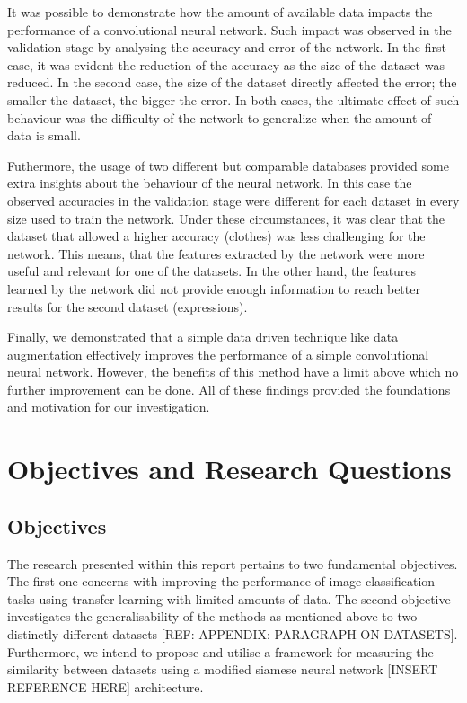 \documentclass{article}
\begin{document}
It was possible to demonstrate how the amount of available data impacts the performance of a convolutional neural network. Such impact was observed in the validation stage by analysing the accuracy and error of the network. In the first case, it was evident the reduction of the accuracy as the size of the dataset was reduced. In the second case, the size of the dataset directly affected the error; the smaller the dataset, the bigger the error. In both cases, the ultimate effect of such behaviour was the difficulty of the network to generalize when the amount of data is small.

Futhermore, the usage of two different but comparable databases provided some extra insights about the behaviour of the neural network. In this case the observed accuracies in the validation stage were different for each dataset in every size used to train the network. Under these circumstances, it was clear that the dataset that allowed a higher accuracy (clothes) was less challenging for the network. This means, that the features extracted by the network were more useful and relevant for one of the datasets. In the other hand, the features learned by the network did not provide enough information to reach better results for the second dataset (expressions).

Finally, we demonstrated that a simple data driven technique like data augmentation effectively improves the performance of a simple convolutional neural network. However, the benefits of this method have a limit above which no further improvement can be done. All of these findings provided the foundations and motivation for our investigation.

\section{Objectives and Research Questions}
\label{sec:obj_questions}

\subsection{Objectives}
\label{sec:objectives}

The research presented within this report pertains to two fundamental objectives. The first one concerns with improving the performance of image classification tasks using transfer learning with limited amounts of data. The second objective investigates the generalisability of the methods as mentioned above to two distinctly different datasets [REF: APPENDIX: PARAGRAPH ON DATASETS]. Furthermore, we intend to propose and utilise a framework for measuring the similarity between datasets using a modified siamese neural network [INSERT REFERENCE HERE] architecture.
\end{document}
